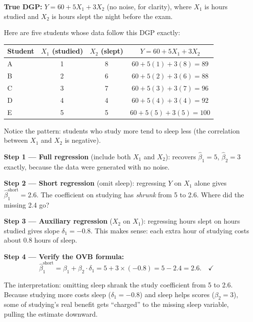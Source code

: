 \documentclass[11pt,a4paper]{article}
\theoremstyle{definition}
\theoremstyle{plain}
\theoremstyle{remark}
\newcommand{\bhat}{\hat{\beta}}
\begin{document}
\begin{numermark}[title={Studying, Sleeping, and Exam Scores}]
\textbf{True DGP:} $Y = 60 + 5X_1 + 3X_2$ (no noise, for clarity), where $X_1$ is hours studied and $X_2$ is hours slept the night before the exam.

Here are five students whose data follow this DGP exactly:

\begin{center}
\begin{tabular}{@{}lccc@{}}
\toprule
Student & $X_1$ (studied) & $X_2$ (slept) & $Y = 60 + 5X_1 + 3X_2$ \\
\midrule
A & 1 & 8 & $60 + 5(1) + 3(8) = 89$ \\
B & 2 & 6 & $60 + 5(2) + 3(6) = 88$ \\
C & 3 & 7 & $60 + 5(3) + 3(7) = 96$ \\
D & 4 & 4 & $60 + 5(4) + 3(4) = 92$ \\
E & 5 & 5 & $60 + 5(5) + 3(5) = 100$ \\
\bottomrule
\end{tabular}
\end{center}

Notice the pattern: students who study more tend to sleep less (the correlation between $X_1$ and $X_2$ is negative).

\textbf{Step 1 --- Full regression} (include both $X_1$ and $X_2$): recovers $\bhat_1 = 5$, $\bhat_2 = 3$ exactly, because the data were generated with no noise.

\textbf{Step 2 --- Short regression} (omit sleep): regressing $Y$ on $X_1$ alone gives $\bhat_1^{\text{short}} = 2.6$. The coefficient on studying has \emph{shrunk} from 5 to 2.6. Where did the missing 2.4 go?

\textbf{Step 3 --- Auxiliary regression} ($X_2$ on $X_1$): regressing hours slept on hours studied gives slope $\delta_1 = -0.8$. This makes sense: each extra hour of studying costs about 0.8 hours of sleep.

\textbf{Step 4 --- Verify the OVB formula:}
\[
  \bhat_1^{\text{short}} = \beta_1 + \beta_2 \cdot \delta_1 = 5 + 3 \times (-0.8) = 5 - 2.4 = 2.6. \quad \checkmark
\]

The interpretation: omitting sleep shrank the study coefficient from 5 to 2.6. Because studying more costs sleep ($\delta_1 = -0.8$) and sleep helps scores ($\beta_2 = 3$), some of studying's real benefit gets ``charged'' to the missing sleep variable, pulling the estimate downward.
\end{numermark}
\end{document}
